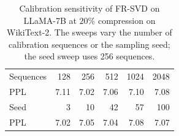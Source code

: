 \begin{table}[tbp]
\centering
\small
\setlength{\tabcolsep}{3pt}
\renewcommand{\arraystretch}{1.10}
\begin{tabular}{@{}lrrrrr@{}}
\toprule
Sequences & 128 & 256 & 512 & 1024 & 2048 \\
PPL & 7.11 & 7.02 & 7.06 & 7.10 & 7.08 \\
\midrule
Seed & 3 & 10 & 42 & 57 & 100 \\
PPL & 7.02 & 7.05 & 7.04 & 7.08 & 7.07 \\
\bottomrule
\end{tabular}
\caption{Calibration sensitivity of FR-SVD on LLaMA-7B at $20\%$ compression
on WikiText-2. The sweeps vary the number of calibration sequences or the sampling
seed; the seed sweep uses 256 sequences.}
\label{tab:calibration-sensitivity}
\end{table}
